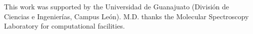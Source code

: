 \documentclass[aps,jcp,reprint,twocolumn,superscriptaddress,showpacs,amsmath,amssymb]{revtex4-2}
\begin{document}
\begin{acknowledgments}
This work was supported by the Universidad de Guanajuato (Divisi\'on de Ciencias e Ingenier\'ias, Campus Le\'on). M.D. thanks the Molecular Spectroscopy Laboratory for computational facilities.
\end{acknowledgments}


\end{document}

